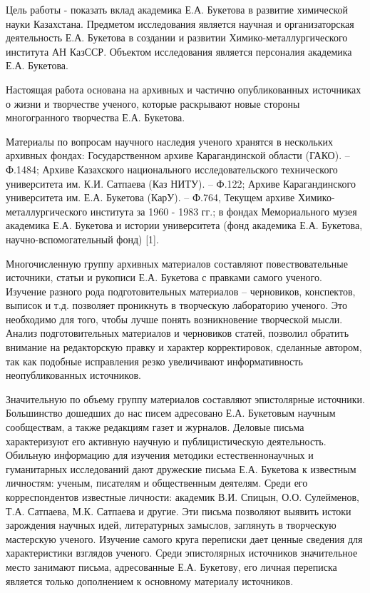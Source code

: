 \begin{multicols}{2}
Цель работы - показать вклад академика Е.А. Букетова в развитие
химической науки Казахстана. Предметом исследования является научная и
организаторская деятельность Е.А. Букетова в создании и развитии
Химико-металлургического института АН КазССР. Объектом исследования
является персоналия академика Е.А. Букетова.

Настоящая работа основана на архивных и частично опубликованных
источниках о жизни и творчестве ученого, которые раскрывают новые
стороны многогранного творчества Е.А. Букетова.

Материалы по вопросам научного наследия ученого хранятся в нескольких
архивных фондах: Государственном архиве Карагандинской области (ГАКО).
-- Ф.1484; Архиве Казахского национального исследовательского
технического университета им. К.И. Сатпаева (Каз НИТУ). -- Ф.122; Архиве
Карагандинского университета им. Е.А. Букетова (КарУ). -- Ф.764, Текущем
архиве Химико-металлургического института за 1960 - 1983 гг.; в фондах
Мемориального музея академика Е.А. Букетова и истории университета (фонд
академика Е.А. Букетова, научно-вспомогательный фонд) {[}1{]}.

Многочисленную группу архивных материалов составляют повествовательные
источники, статьи и рукописи Е.А. Букетова с правками самого ученого.
Изучение разного рода подготовительных материалов -- черновиков,
конспектов, выписок и т.д. позволяет проникнуть в творческую лабораторию
ученого. Это необходимо для того, чтобы лучше понять возникновение
творческой мысли. Анализ подготовительных материалов и черновиков
статей, позволил обратить внимание на редакторскую правку и характер
корректировок, сделанные автором, так как подобные исправления резко
увеличивают информативность неопубликованных источников.

Значительную по объему группу материалов составляют эпистолярные
источники. Большинство дошедших до нас писем адресовано Е.А. Букетовым
научным сообществам, а также редакциям газет и журналов. Деловые письма
характеризуют его активную научную и публицистическую деятельность.
Обильную информацию для изучения методики естественнонаучных и
гуманитарных исследований дают дружеские письма Е.А. Букетова к
известным личностям: ученым, писателям и общественным деятелям. Среди
его корреспондентов известные личности: академик В.И. Спицын, О.О.
Сулейменов, Т.А. Сатпаева, М.К. Сатпаева и другие. Эти письма позволяют
выявить истоки зарождения научных идей, литературных замыслов, заглянуть
в творческую мастерскую ученого. Изучение самого круга переписки дает
ценные сведения для характеристики взглядов ученого. Среди эпистолярных
источников значительное место занимают письма, адресованные Е.А.
Букетову, его личная переписка является только дополнением к основному
материалу источников.


\end{multicols}
